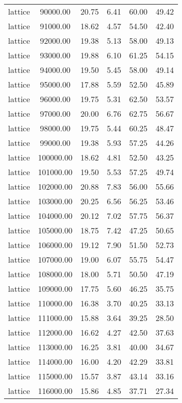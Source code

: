\begin{table}[ht]
\begin{table}[ht]
\begin{tabular}{|cccccc}
  lattice & 90000.00 & 20.75 & 6.41 & 60.00 & 49.42 \\ 
  lattice & 91000.00 & 18.62 & 4.57 & 54.50 & 42.40 \\ 
  lattice & 92000.00 & 19.38 & 5.13 & 58.00 & 49.13 \\ 
  lattice & 93000.00 & 19.88 & 6.10 & 61.25 & 54.15 \\ 
  lattice & 94000.00 & 19.50 & 5.45 & 58.00 & 49.14 \\ 
  lattice & 95000.00 & 17.88 & 5.59 & 52.50 & 45.89 \\ 
  lattice & 96000.00 & 19.75 & 5.31 & 62.50 & 53.57 \\ 
  lattice & 97000.00 & 20.00 & 6.76 & 62.75 & 56.67 \\ 
  lattice & 98000.00 & 19.75 & 5.44 & 60.25 & 48.47 \\ 
  lattice & 99000.00 & 19.38 & 5.93 & 57.25 & 44.26 \\ 
  lattice & 100000.00 & 18.62 & 4.81 & 52.50 & 43.25 \\ 
  lattice & 101000.00 & 19.50 & 5.53 & 57.25 & 49.74 \\ 
  lattice & 102000.00 & 20.88 & 7.83 & 56.00 & 55.66 \\ 
  lattice & 103000.00 & 20.25 & 6.56 & 56.25 & 53.46 \\ 
  lattice & 104000.00 & 20.12 & 7.02 & 57.75 & 56.37 \\ 
  lattice & 105000.00 & 18.75 & 7.42 & 47.25 & 50.65 \\ 
  lattice & 106000.00 & 19.12 & 7.90 & 51.50 & 52.73 \\ 
  lattice & 107000.00 & 19.00 & 6.07 & 55.75 & 54.47 \\ 
  lattice & 108000.00 & 18.00 & 5.71 & 50.50 & 47.19 \\ 
  lattice & 109000.00 & 17.75 & 5.60 & 46.25 & 35.75 \\ 
  lattice & 110000.00 & 16.38 & 3.70 & 40.25 & 33.13 \\ 
  lattice & 111000.00 & 15.88 & 3.64 & 39.25 & 28.50 \\ 
  lattice & 112000.00 & 16.62 & 4.27 & 42.50 & 37.63 \\ 
  lattice & 113000.00 & 16.25 & 3.81 & 40.00 & 34.67 \\ 
  lattice & 114000.00 & 16.00 & 4.20 & 42.29 & 33.81 \\ 
  lattice & 115000.00 & 15.57 & 3.87 & 43.14 & 33.16 \\ 
  lattice & 116000.00 & 15.86 & 4.85 & 37.71 & 27.34 \\ 

\end{tabular}
\end{table}
\end{table}
